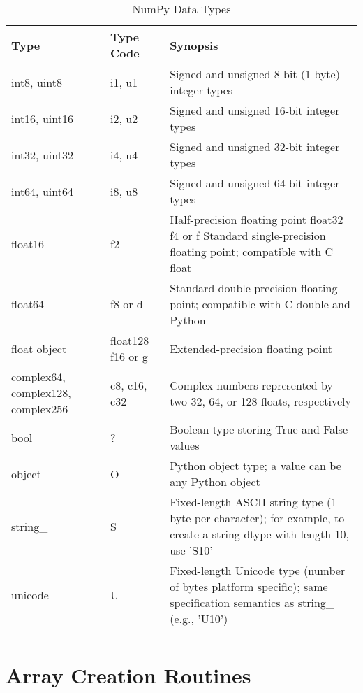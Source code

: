 \documentclass[a4paper,11pt]{book}
\numberwithin{figure}{chapter}
\numberwithin{table}{chapter}
\begin{document}
\clearpage

\begin{sidewaystable}[!htbp]
	\centering
	\caption{NumPy Data Types}
	\label{tab:array_data_types}
	\begin{tabular}{p{7cm}p{4cm}p{10cm}}
		\toprule \toprule
			Type & Type Code & Synopsis \\
			\midrule 
			int8, uint8\dotfill & i1, u1 & Signed and unsigned 8-bit (1 byte) integer types \\ 
			int16, uint16\dotfill & i2, u2 & Signed and unsigned 16-bit integer types \\
			int32, uint32\dotfill & i4, u4 & Signed and unsigned 32-bit integer types \\ 
			int64, uint64\dotfill & i8, u8 & Signed and unsigned 64-bit integer types \\
			float16\dotfill & f2 & Half-precision floating point float32 f4 or f Standard single-precision floating point; compatible with C float\\ 
			float64\dotfill & f8 or d & Standard double-precision floating point; compatible with C double and Python\\ 
			float object\dotfill & float128 f16 or g & Extended-precision floating point \\  
			complex64, complex128, complex256\dotfill & c8, c16, c32 & Complex numbers represented by two 32, 64, or 128 floats, respectively  \\ 
			bool\dotfill & ? & Boolean type storing True and False values \\ 
			object\dotfill & O & Python object type; a value can be any Python object \\ 
			string\_\dotfill & S & Fixed-length ASCII string type (1 byte per character); for example, to create a string dtype with length 10, use 'S10' \\ 
			unicode\_\dotfill & U & Fixed-length Unicode type (number of bytes platform specific); same specification semantics as string\_ (e.g., 'U10')	\\
     			\bottomrule \\
	\end{tabular}
\end{sidewaystable}
\clearpage

\section{Array Creation Routines}
\label{sec:array_creation}
\end{document}
